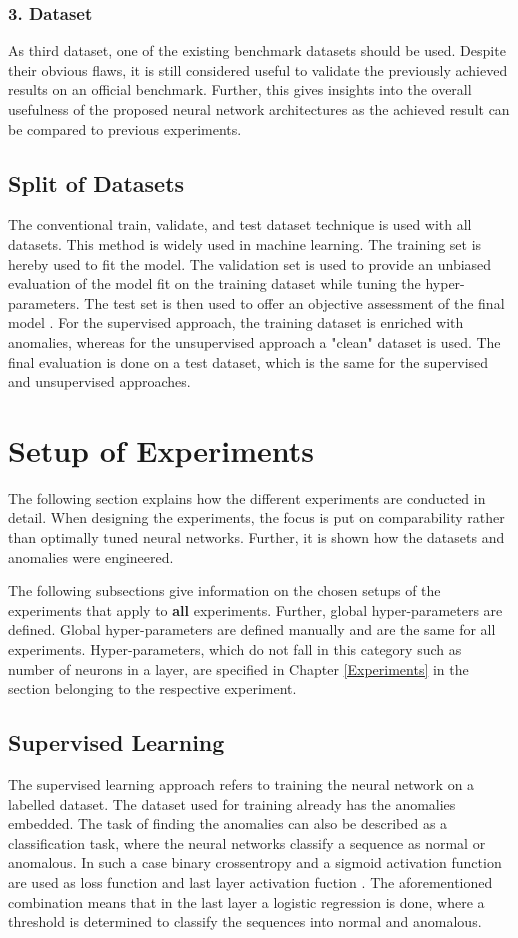 \subsubsection{3. Dataset}
As third dataset, one of the existing benchmark datasets should be used. Despite their obvious flaws, it is still considered useful to validate the previously achieved results on an official benchmark. Further, this gives insights into the overall usefulness of the proposed neural network architectures as the achieved result can be compared to previous experiments.

\subsection{Split of Datasets}
The conventional train, validate, and test dataset technique is used with all datasets.
This method is widely used in machine learning. The training set is hereby used to fit the model. The validation set is used to provide an unbiased evaluation of the model fit on the training dataset while tuning the hyper-parameters. The test set is then used to offer an objective assessment of the final model \parencite{Brownlee2017}. For the supervised approach, the training dataset is enriched with anomalies, whereas for the unsupervised approach a "clean" dataset is used. The final evaluation is done on a test dataset, which is the same for the supervised and unsupervised approaches.


\section{Setup of Experiments} \label{SetupOfExperiments}
The following section explains how the different experiments are conducted in detail. When designing the experiments, the focus is put on comparability rather than optimally tuned neural networks.  Further, it is shown how the datasets and anomalies were engineered.

The following subsections give information on the chosen setups of the experiments that apply to \textbf{all} experiments. Further, global hyper-parameters are defined. Global hyper-parameters are defined manually and are the same for all experiments. Hyper-parameters, which do not fall in this category such as number of neurons in a layer, are specified in Chapter \ref{Experiments} in the section belonging to the respective experiment.

\subsection{Supervised Learning}
The supervised learning approach refers to training the neural network on a labelled dataset. The dataset used for training already has the anomalies embedded. The task of finding the anomalies can also be described as a classification task, where the neural networks classify a sequence as normal or anomalous. In such a case binary crossentropy and a sigmoid activation function are used as loss function and last layer activation fuction \parencite{Brownlee2019}. The aforementioned combination means that in the last layer a logistic regression is done, where a threshold is determined to classify the sequences into normal and anomalous.

